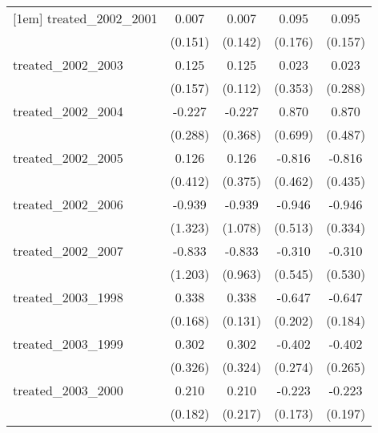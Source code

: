 {\begin{tabular}{l*{4}{c}}
[1em]
treated\_2002\_2001&       0.007         &       0.007         &       0.095         &       0.095         \\
            &     (0.151)         &     (0.142)         &     (0.176)         &     (0.157)         \\
[1em]
treated\_2002\_2003&       0.125         &       0.125         &       0.023         &       0.023         \\
            &     (0.157)         &     (0.112)         &     (0.353)         &     (0.288)         \\
[1em]
treated\_2002\_2004&      -0.227         &      -0.227         &       0.870         &       0.870         \\
            &     (0.288)         &     (0.368)         &     (0.699)         &     (0.487)         \\
[1em]
treated\_2002\_2005&       0.126         &       0.126         &      -0.816         &      -0.816         \\
            &     (0.412)         &     (0.375)         &     (0.462)         &     (0.435)         \\
[1em]
treated\_2002\_2006&      -0.939         &      -0.939         &      -0.946         &      -0.946\sym{**} \\
            &     (1.323)         &     (1.078)         &     (0.513)         &     (0.334)         \\
[1em]
treated\_2002\_2007&      -0.833         &      -0.833         &      -0.310         &      -0.310         \\
            &     (1.203)         &     (0.963)         &     (0.545)         &     (0.530)         \\
[1em]
treated\_2003\_1998&       0.338\sym{*}  &       0.338\sym{**} &      -0.647\sym{**} &      -0.647\sym{***}\\
            &     (0.168)         &     (0.131)         &     (0.202)         &     (0.184)         \\
[1em]
treated\_2003\_1999&       0.302         &       0.302         &      -0.402         &      -0.402         \\
            &     (0.326)         &     (0.324)         &     (0.274)         &     (0.265)         \\
[1em]
treated\_2003\_2000&       0.210         &       0.210         &      -0.223         &      -0.223         \\
            &     (0.182)         &     (0.217)         &     (0.173)         &     (0.197)         \\

\end{tabular}}
